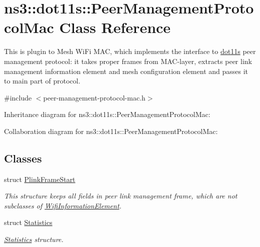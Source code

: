 \hypertarget{classns3_1_1dot11s_1_1PeerManagementProtocolMac}{}\section{ns3\+:\+:dot11s\+:\+:Peer\+Management\+Protocol\+Mac Class Reference}
\label{classns3_1_1dot11s_1_1PeerManagementProtocolMac}


This is plugin to Mesh Wi\+Fi M\+AC, which implements the interface to \hyperlink{namespacens3_1_1dot11s}{dot11s} peer management protocol\+: it takes proper frames from M\+A\+C-\/layer, extracts peer link management information element and mesh configuration element and passes it to main part of protocol.  




{\ttfamily \#include $<$peer-\/management-\/protocol-\/mac.\+h$>$}



Inheritance diagram for ns3\+:\+:dot11s\+:\+:Peer\+Management\+Protocol\+Mac\+:


Collaboration diagram for ns3\+:\+:dot11s\+:\+:Peer\+Management\+Protocol\+Mac\+:
\subsection*{Classes}
\begin{DoxyCompactItemize}
\item 
struct \hyperlink{structns3_1_1dot11s_1_1PeerManagementProtocolMac_1_1PlinkFrameStart}{Plink\+Frame\+Start}
\begin{DoxyCompactList}\small\item\em This structure keeps all fields in peer link management frame, which are not subclasses of \hyperlink{classns3_1_1WifiInformationElement}{Wifi\+Information\+Element}. \end{DoxyCompactList}\item 
struct \hyperlink{structns3_1_1dot11s_1_1PeerManagementProtocolMac_1_1Statistics}{Statistics}
\begin{DoxyCompactList}\small\item\em \hyperlink{structns3_1_1dot11s_1_1PeerManagementProtocolMac_1_1Statistics}{Statistics} structure. \end{DoxyCompactList}\end{DoxyCompactItemize}
